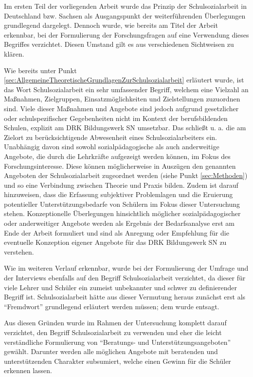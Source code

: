 \noindent
Im ersten Teil der vorliegenden Arbeit wurde das Prinzip der Schulsozialarbeit in Deutschland bzw. Sachsen als Ausgangspunkt der weiterführenden Überlegungen grundlegend dargelegt. Dennoch wurde, wie bereits am Titel der Arbeit erkennbar, bei der Formulierung der Forschungsfragen auf eine Verwendung dieses Begriffes verzichtet. Diesen Umstand gilt es aus verschiedenen Sichtweisen zu klären.
 
Wie bereits unter Punkt \ref{sec:AllgemeineTheoretischeGrundlagenZurSchulsozialarbeit} erläutert wurde, ist das Wort Schulsozialarbeit ein sehr umfassender Begriff, welchem eine Vielzahl an Maßnahmen, Zielgruppen, Einsatzmöglichkeiten und Zielstellungen zuzuordnen sind. Viele dieser Maßnahmen und Angebote sind jedoch aufgrund gesetzlicher oder schulspezifischer Gegebenheiten nicht im Kontext der berufsbildenden Schulen, explizit am DRK Bildungswerk SN umsetzbar. Das schließt u. a. die am Zielort zu berücksichtigende Abwesenheit eines Schulsozialarbeiters ein. Unabhängig davon sind sowohl sozialpädagogische als auch anderweitige Angebote, die durch die Lehrkräfte aufgezeigt werden können, im Fokus des Forschungsinteresse. Diese können möglicherweise in Auszügen den genannten Angeboten der Schulsozialarbeit zugeordnet werden (siehe Punkt \ref{sec:Methoden}) und so eine Verbindung zwischen Theorie und Praxis bilden. Zudem ist darauf hinzuweisen, dass die Erfassung subjektiver Problemlagen und die Eruierung potentieller Unterstützungsbedarfe von Schülern im Fokus dieser Untersuchung stehen. Konzeptionelle Überlegungen hinsichtlich möglicher sozialpädagogischer oder anderweitiger Angebote werden als Ergebnis der Bedarfsanalyse erst am Ende der Arbeit formuliert und sind als Anregung oder Empfehlung für die eventuelle Konzeption eigener Angebote für das DRK Bildungswerk SN zu verstehen.

Wie im weiteren Verlauf erkennbar, wurde bei der Formulierung der Umfrage und der Interviews ebenfalls auf den Begriff Schulsozialarbeit verzichtet, da dieser für viele Lehrer und Schüler ein zumeist unbekannter und schwer zu definierender Begriff ist. Schulsozialarbeit hätte aus dieser Vermutung heraus zunächst erst als "`Fremdwort"' grundlegend erläutert werden müssen; dem wurde entsagt.

Aus diesen Gründen wurde im Rahmen der Untersuchung komplett darauf verzichtet, den Begriff Schulsozialarbeit zu verwenden und eher die leicht verständliche Formulierung von "`Beratungs- und Unterstützungsangeboten"' gewählt. Darunter werden alle möglichen Angebote mit beratenden und unterstützenden Charakter subsumiert, welche einen Gewinn für die Schüler erkennen lassen.

